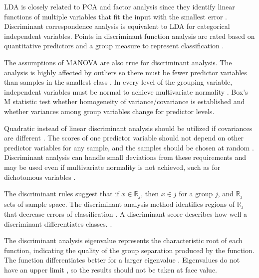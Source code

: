 \documentclass[sn-mathphys-num]{sn-jnl}%
\begin{document}
LDA is closely related to PCA and factor analysis since they identify linear functions of multiple variables that fit the input with the smallest error \cite{martinez2001pca}. Discriminant correspondence analysis \cite{abdi2007discriminant, perriere2003use} is equivalent to LDA for categorical independent variables. Points in discriminant function analysis are rated based on quantitative predictors and a group measure \cite{cokluk2008discriminant} to represent classification \cite{venables2013modern}.

The assumptions of MANOVA are also true for discriminant analysis. The analysis is highly affected by outliers so there must be fewer predictor variables than samples in the smallest class \cite{cokluk2008discriminant}. In every level of the grouping variable, independent variables must be normal to achieve multivariate normality \cite{cokluk2008discriminant, hansen2005using}. Box's M statistic \cite{hansen2005using} test whether homogeneity of variance/covariance is established and whether variances among group variables change for predictor levels. 

Quadratic instead of linear discriminant analysis should be utilized if covariances are different \cite{cokluk2008discriminant}. The scores of one predictor variable should not depend on other predictor variables for any sample, and the samples should be chosen at random \cite{cokluk2008discriminant, hansen2005using}. Discriminant analysis can handle small deviations from these requirements \cite{lachenbruch1979discriminant} and may be used even if multivariate normality is not achieved, such as for dichotomous variables \cite{klecka1980discriminant}.

The discriminant rules suggest that if $x\in \mathbb{R}_{j}$, then $x\in j$ for a group $j$, and $\mathbb{R}_{j}$ sets of sample space. The discriminant analysis method identifies regions of $\mathbb{R}_{j}$ that decrease errors of classification \cite{Hrdle2003AppliedMS}. A discriminant score describes how well a discriminant differentiates classes. \cite{archive765Discriminant}.
 
The discriminant analysis eigenvalue represents the characteristic root of each function, indicating the quality of the group separation produced by the function. The function differentiates better for a larger eigenvalue \cite{cokluk2008discriminant}. Eigenvalues do not have an upper limit \cite{cokluk2008discriminant, hansen2005using}, so the results should not be taken at face value.
\end{document}
